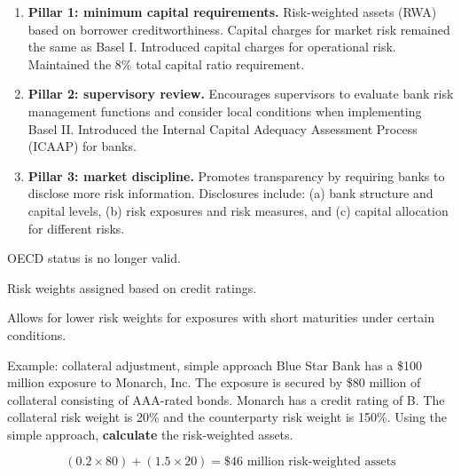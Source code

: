 \begin{enumerate}
\item[\textcolor{rust}{\sffamily\bfseries 1)}] \textbf{Pillar 1: minimum capital
requirements.} Risk-weighted assets (RWA) based on borrower creditworthiness.
Capital charges for market risk remained the same as Basel I. Introduced capital
charges for operational risk. Maintained the 8\% total capital ratio requirement.
\item[\textcolor{rust}{\sffamily\bfseries 2)}] \textbf{Pillar 2: supervisory
review.} Encourages supervisors to evaluate bank risk management functions and
consider local conditions when implementing Basel II. Introduced the Internal
Capital Adequacy Assessment Process (ICAAP) for banks.
\item[\textcolor{rust}{\sffamily\bfseries 3)}] \textbf{Pillar 3: market
discipline.} Promotes transparency by requiring banks to disclose more risk
information. Disclosures include: (a) bank structure and capital levels, (b) risk
exposures and risk measures, and (c) capital allocation for different risks.
\end{enumerate}





\begin{lettered}
\item OECD status is no longer valid.
\item Risk weights assigned based on credit ratings.
\item Allows for lower risk weights for exposures with short maturities under
certain conditions.
\end{lettered}

\begin{orexambox}{Example: collateral adjustment, simple approach}
Blue Star Bank has a \$100 million exposure to Monarch, Inc. The exposure is
secured by \$80 million of collateral consisting of AAA-rated bonds. Monarch has a
credit rating of B. The collateral risk weight is 20\% and the counterparty risk
weight is 150\%. Using the simple approach, \textbf{calculate} the risk-weighted
assets.

\vspace{6pt}
\par
\[
(0.2\times80)+(1.5\times20)=\$46\text{ million risk-weighted assets}
\]
\end{orexambox}

